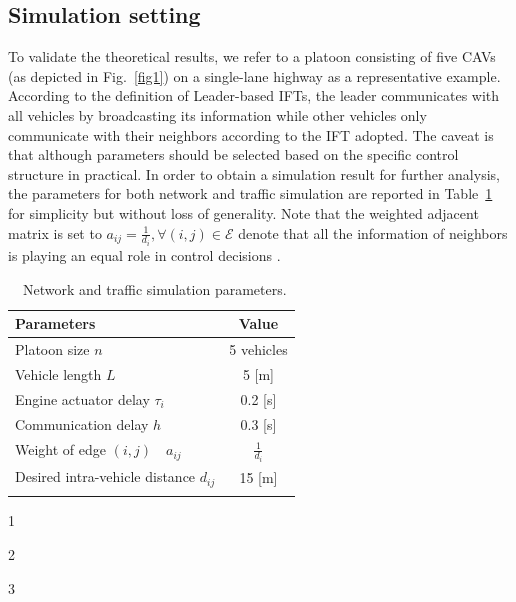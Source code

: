 \documentclass[a4paper]{cas-sc}
\begin{document}
\subsection{Simulation setting}
\label{Section 5.1}

To validate the theoretical results, we refer to a platoon consisting of five CAVs (as depicted in Fig.~\ref{fig1}) on a single-lane highway as a representative example. According to the definition of Leader-based IFTs, the leader communicates with all vehicles by broadcasting its information while other vehicles only communicate with their neighbors according to the IFT adopted. The caveat is that although parameters should be selected based on the specific control structure in practical. In order to obtain a simulation result for further analysis, the parameters for both network and traffic simulation are reported in Table~\ref{table1} for simplicity but without loss of generality. Note that the weighted adjacent matrix is set to ${a_{ij}} = \frac{1}{{{d_i}}},\forall (i,j) \in \mathcal{E}$ denote that all the information of neighbors is playing an equal role in control decisions \citep{li2017evaluation}.

\begin{table}
  \centering

  \setlength{\abovecaptionskip}{0pt}
  \setlength{\belowcaptionskip}{10pt}%
  \begin{threeparttable}[b]
    \caption{~Network and traffic simulation parameters.}
    {\begin{tabular}{lc} \toprule
        Parameters                                         & Value                                         \\ \midrule
        Platoon size $n$                                   & 5 vehicles                                    \\
        Vehicle length $L$                                 & 5 [m]                                         \\
        Engine actuator delay $\tau_i$                     & 0.2 [s] \tnote{1}                             \\
        Communication delay $h$                            & 0.3 [s] \tnote{2}                             \\
        Weight of edge $\left( {i,j} \right) \quad a_{ij}$ & $\frac{1}{{{d_i}}}$                           \\
        Desired intra-vehicle distance $d_{ij}$            & 15 [m] \tnote{3}                                       \\
        \bottomrule
        \label{table1}
      \end{tabular}}
    \begin{tablenotes}
      \item[1] \citep{Wang2018a,Zhou2020}
      \item[2] \citep{Abbas2018,Thota2019}
      \item[3] \citep{razzaghpour2021impact}
    \end{tablenotes}
  \end{threeparttable}
\end{table}
\end{document}
